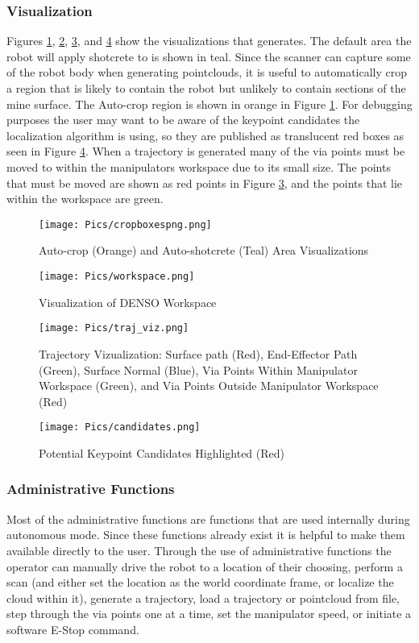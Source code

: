 \subsubsection{Visualization}
Figures \ref{fig:cropb}, \ref{fig:worksp}, \ref{fig:trajviz}, and \ref{fig:cands} show the visualizations that  generates. The default area the robot will apply shotcrete to is shown in teal. Since the scanner can capture some of the robot body when generating pointclouds, it is useful to automatically crop a region that is likely to contain the robot but unlikely to contain sections of the mine surface. The Auto-crop region is shown in orange in Figure \ref{fig:cropb}. For debugging purposes the user may want to be aware of the keypoint candidates the localization algorithm is using, so they are published as translucent red boxes as seen in Figure \ref{fig:cands}. When a trajectory is generated many of the via points must be moved to within the manipulators workspace due to its small size. The points that must be moved are shown as red points in Figure \ref{fig:trajviz}, and the points that lie within the workspace are green.\\
\begin{figure}[h]
    \centering
    \texttt{[image: Pics/cropboxespng.png]}
    \caption{Auto-crop (Orange) and Auto-shotcrete (Teal) Area Visualizations}
    \label{fig:cropb}
\end{figure}
\begin{figure}[h]
    \centering
    \texttt{[image: Pics/workspace.png]}
    \caption{Visualization of DENSO Workspace}
    \label{fig:worksp}
\end{figure}
\begin{figure}[h]
    \centering
    \texttt{[image: Pics/traj\_viz.png]}
    \caption{Trajectory Vizualization: Surface path (Red), End-Effector Path (Green), Surface Normal (Blue), Via Points Within Manipulator Workspace (Green), and Via Points Outside Manipulator Workspace (Red)}
    \label{fig:trajviz}
\end{figure}
\begin{figure}[h]
    \centering
    \texttt{[image: Pics/candidates.png]}
    \caption{Potential Keypoint Candidates Highlighted (Red)}
    \label{fig:cands}
\end{figure}
\subsubsection{Administrative Functions}
Most of the administrative functions are functions that are used internally during autonomous mode. Since these functions already exist it is helpful to make them available directly to the user. Through the use of administrative functions the operator can manually drive the robot to a location of their choosing, perform a scan (and either set the location as the world coordinate frame, or localize the cloud within it), generate a trajectory, load a trajectory or pointcloud from file, step through the via points one at a time, set the manipulator speed, or initiate a software E-Stop command. \\

